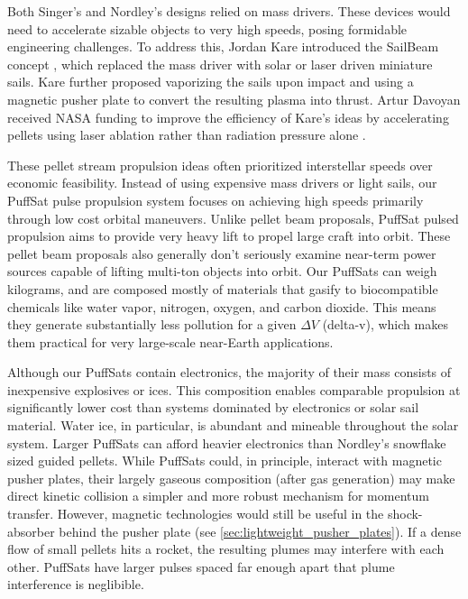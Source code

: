 \documentclass{article}
\begin{document}
Both Singer’s and Nordley’s designs relied on mass drivers.  These devices would need to accelerate sizable objects to very high speeds, posing formidable engineering challenges. To address this, Jordan Kare introduced the SailBeam concept \cite{kare2001sailbeam}, which replaced the mass driver with solar or laser driven miniature sails. Kare further proposed vaporizing the sails upon impact and using a magnetic pusher plate to convert the resulting plasma into thrust.   Artur Davoyan received NASA funding to improve the efficiency of Kare's ideas by accelerating pellets using laser ablation rather than radiation pressure alone \cite{davoyan2023pelletbeam}.

These pellet stream propulsion ideas often prioritized interstellar speeds over economic feasibility.  Instead of using expensive mass drivers or light sails, our PuffSat pulse propulsion system focuses on achieving high speeds primarily through low cost orbital maneuvers.  Unlike pellet beam proposals, PuffSat pulsed propulsion aims to  provide very heavy lift to propel large craft into orbit.  These pellet beam proposals also generally don't seriously examine near-term power sources capable of lifting multi-ton objects into orbit. Our PuffSats can weigh kilograms, and are composed mostly of materials that gasify to biocompatible chemicals like water vapor, nitrogen, oxygen, and carbon dioxide.   This means they generate substantially less pollution for a given $\Delta V$ (delta-v), which makes them practical for very large-scale near-Earth applications.  

Although our PuffSats contain electronics, the majority of their mass consists of inexpensive explosives or ices. This composition enables comparable propulsion at significantly lower cost than systems dominated by electronics or solar sail material. Water ice, in particular, is abundant and mineable throughout the solar system.  Larger PuffSats can afford heavier electronics than Nordley's snowflake sized guided pellets.  While PuffSats could, in principle, interact with magnetic pusher plates, their largely gaseous composition (after gas generation) may make direct kinetic collision a simpler and more robust mechanism for momentum transfer.  However, magnetic technologies would still be useful in the shock-absorber behind the pusher plate (see \autoref{sec:lightweight_pusher_plates}).  If a dense flow of small pellets hits a rocket, the resulting plumes may interfere with each other.   PuffSats have larger pulses spaced far enough apart that plume interference is neglibible.
\end{document}
